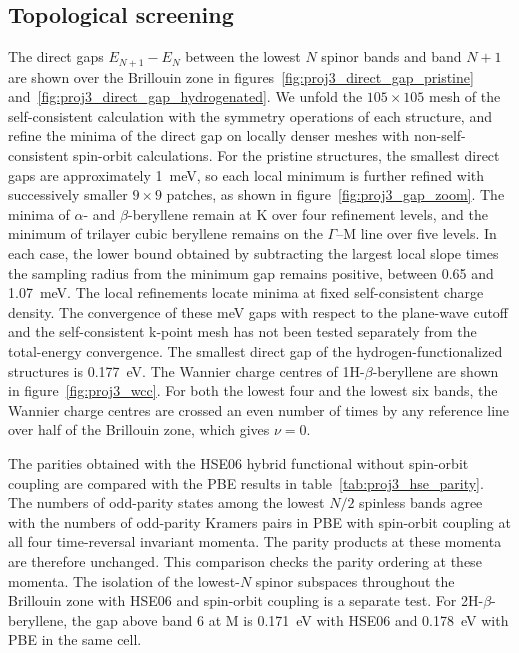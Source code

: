 \subsection*{Topological screening}

The direct gaps $E_{N+1}-E_{N}$ between the lowest $N$ spinor bands and band $N+1$ are shown over the Brillouin zone in figures~\ref{fig:proj3_direct_gap_pristine} and~\ref{fig:proj3_direct_gap_hydrogenated}.
We unfold the $105 \times 105$ mesh of the self-consistent calculation with the symmetry operations of each structure,
and refine the minima of the direct gap on locally denser meshes with non-self-consistent spin-orbit calculations.
For the pristine structures,
the smallest direct gaps are approximately \qty{1}{\milli\electronvolt},
so each local minimum is further refined with successively smaller $9 \times 9$ patches,
as shown in figure~\ref{fig:proj3_gap_zoom}.
The minima of $\alpha$- and $\beta$-beryllene remain at $\mathrm{K}$ over four refinement levels,
and the minimum of trilayer cubic beryllene remains on the $\Gamma$--$\mathrm{M}$ line over five levels.
In each case,
the lower bound obtained by subtracting the largest local slope times the sampling radius from the minimum gap remains positive,
between 0.65 and \qty{1.07}{\milli\electronvolt}.
The local refinements locate minima at fixed self-consistent charge density.
The convergence of these meV gaps with respect to the plane-wave cutoff and the self-consistent k-point mesh has not been tested separately from the total-energy convergence.
The smallest direct gap of the hydrogen-functionalized structures is \qty{0.177}{\electronvolt}.
The Wannier charge centres of 1H-$\beta$-beryllene are shown in figure~\ref{fig:proj3_wcc}.
For both the lowest four and the lowest six bands,
the Wannier charge centres are crossed an even number of times by any reference line over half of the Brillouin zone,
which gives $\nu=0$.

The parities obtained with the HSE06 hybrid functional without spin-orbit coupling are compared with the PBE results in table~\ref{tab:proj3_hse_parity}.
The numbers of odd-parity states among the lowest $N/2$ spinless bands agree with the numbers of odd-parity Kramers pairs in PBE with spin-orbit coupling at all four time-reversal invariant momenta.
The parity products at these momenta are therefore unchanged.
This comparison checks the parity ordering at these momenta.
The isolation of the lowest-$N$ spinor subspaces throughout the Brillouin zone with HSE06 and spin-orbit coupling is a separate test.
For 2H-$\beta$-beryllene,
the gap above band 6 at $\mathrm{M}$ is \qty{0.171}{\electronvolt} with HSE06 and \qty{0.178}{\electronvolt} with PBE in the same cell.

